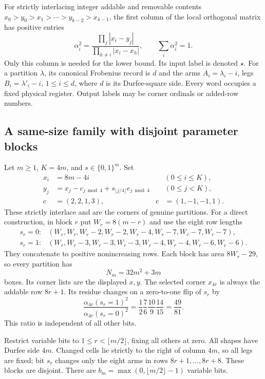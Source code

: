 \documentclass[11pt]{article}
\theoremstyle{definition}
\begin{document}
For strictly interlacing integer addable and removable contents
$x_0>y_0>x_1>\cdots>y_{k-2}>x_{k-1}$, the first column of the local
orthogonal matrix has positive entries
\begin{equation}\label{eq:residue}
 \alpha_i^2=\frac{\prod_j|x_i-y_j|}
 {\prod_{h\ne i}|x_i-x_h|},\qquad \sum_i\alpha_i^2=1.
\end{equation}
Only this column is needed for the lower bound. Its input label is denoted
$\star$. For a partition $\lambda$, its canonical Frobenius record is
$d$ and the arms $A_i=\lambda_i-i$, legs $B_i=\lambda'_i-i$, $1\le i\le d$,
where $d$ is its Durfee-square side. Every word occupies a fixed physical
register. Output labels may be corner ordinals or added-row numbers.

\subsection{A same-size family with disjoint parameter blocks}

Let $m\ge1$, $K=4m$, and $s\in\{0,1\}^m$. Set
\begin{align*}
 x_i&=8m-4i &&(0\le i\le K),\\
 y_j&=x_j-c_{j\bmod4}+s_{\lfloor j/4\rfloor}e_{j\bmod4}
 &&(0\le j<K),\\
 c&=(2,2,1,3),& e&=(1,-1,-1,1).
\end{align*}
These strictly interlace and are the corners of genuine partitions.
For a direct construction, in block $r$ put $W_r=8(m-r)$ and use the eight
row lengths
\[
\begin{array}{ll}
s_r=0:&(W_r,W_r,W_r-2,W_r-2,W_r-4,W_r-7,W_r-7,W_r-7),\\
s_r=1:&(W_r,W_r-3,W_r-3,W_r-3,W_r-4,W_r-4,W_r-6,W_r-6).
\end{array}
\]
They concatenate to positive nonincreasing rows. Each block has area
$8W_r-29$, so every partition has
\[
 N_m=32m^2+3m
\]
boxes. Its corner lists are the displayed $x,y$. The selected corner
$x_{4r}$ is always the addable row $8r+1$. Its residue changes on a
zero-to-one flip of $s_r$ by
\begin{equation}\label{eq:flip}
 \frac{\alpha_{4r}(s_r=1)^2}{\alpha_{4r}(s_r=0)^2}
 =\frac12\frac76\frac{10}{9}\frac{14}{15}=\frac{49}{81}.
\end{equation}
This ratio is independent of all other bits.

Restrict variable bits to $1\le r<\lfloor m/2\rfloor$, fixing all others
at zero. All shapes have Durfee side $4m$. Changed cells lie strictly to
the right of column $4m$, so all legs are fixed; bit $s_r$ changes only
the eight arms in rows $8r+1,\ldots,8r+8$. These blocks are disjoint.
There are $b_m=\max(0,\lfloor m/2\rfloor-1)$ variable bits.
\end{document}
